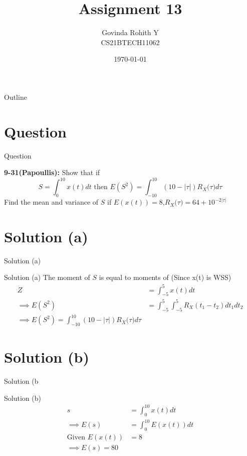 \documentclass{beamer}
\title{Assignment 13}
\author{Govinda Rohith Y\\CS21BTECH11062}
\date{\today}
\providecommand{\abs}[1]{\left\vert#1\right\vert}
\begin{document}
\begin{frame}
    \titlepage 
\end{frame}

\logo{}


\begin{frame}{Outline}
    \tableofcontents
\end{frame}


\section{Question}
\begin{frame}{Question}

\begin{block}{\textbf{9-31(Papoullis):}}
        Show that if
        $$S=\int_0^{10}x(t)dt \text{ then } E(S^2)=\int_{-10}^{10}(10-\abs{\tau})R_X{(\tau})d\tau$$
        Find the mean and variance of $S$ if $E(x(t))=8$,$R_X{(\tau})=64+10^{-2\abs{\tau}}$
    \end{block}
    \end{frame}
    \section{Solution (a)}
    \begin{frame}{Solution (a)}
        \begin{block}{Solution (a)}
        The moment of $S$ is equal to moments of (Since x(t) is WSS)
        \begin{align}
            Z&=\int_{-5}^{5}x(t)dt\\
            \implies E(S^2)&=\int_{-5}^{5}\int_{-5}^{5}R_X(t_1-t_2)dt_1dt_2\\
            \implies\boxed{E(S^2)=\int_{-10}^{10}(10-\abs{\tau})R_X{(\tau})d\tau}
        \end{align}
        \end{block}
    \end{frame}
    
    \section{Solution (b)}
    \begin{frame}{Solution (b}
        \begin{block}{Solution (b)}
        \begin{align}
        s&=\int_0^{10}x(t)dt\\
        \implies E(s)&=\int_0^{10}E(x(t))dt\\
        \text{Given }E(x(t))&=8\\
        \implies \boxed{E(s)=80}
        \end{align}
        \end{block}
    \end{frame}
\end{document}
